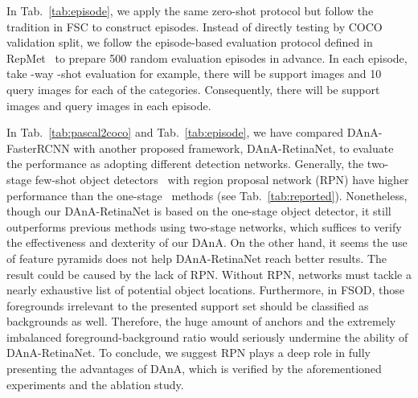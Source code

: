 \documentclass[journal]{IEEEtran}
\begin{document}
In Tab.~\ref{tab:episode}, we apply the same zero-shot protocol but follow the tradition in FSC to construct episodes.
Instead of directly testing by COCO validation split, we follow the episode-based evaluation protocol defined in RepMet~\cite{karlinsky2019repmet} to prepare 500 random evaluation episodes in advance.
In each episode, take -way -shot evaluation for example, there will be  support images and 10 query images for each of the  categories.
Consequently, there will be  support images and  query images in each episode.


In Tab.~\ref{tab:pascal2coco} and Tab.~\ref{tab:episode}, we have compared DAnA-FasterRCNN with another proposed framework, DAnA-RetinaNet, to evaluate the performance as adopting different detection networks. 
Generally, the two-stage few-shot object detectors~\cite{wang2020frustratingly, yan2019meta, fan2020few, wu2020multi, xiao2020few} with region proposal network (RPN) have higher performance than the one-stage~\cite{kang2019few, perez2020incremental} methods (see Tab.~\ref{tab:reported}).
Nonetheless, though our DAnA-RetinaNet is based on the one-stage object detector, it still outperforms previous methods using two-stage networks, which suffices to verify the effectiveness and dexterity of our DAnA.
On the other hand, it seems the use of feature pyramids does not help DAnA-RetinaNet reach better results.
The result could be caused by the lack of RPN.
Without RPN, networks must tackle a nearly exhaustive list of potential object locations.
Furthermore, in FSOD, those foregrounds irrelevant to the presented support set should be classified as backgrounds as well.
Therefore, the huge amount of anchors and the extremely imbalanced foreground-background ratio would seriously undermine the ability of DAnA-RetinaNet.
To conclude, we suggest RPN plays a deep role in fully presenting the advantages of DAnA, which is verified by the aforementioned experiments and the ablation study.
\end{document}
